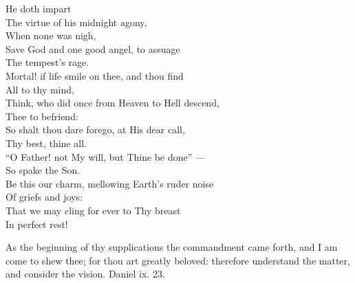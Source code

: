  He doth impart \\
 The virtue of his midnight agony, \\
 When none was nigh, \\
 Save God and one good angel, to assuage \\
 The tempest’s rage. \\
  Mortal! if life smile on thee, and thou find \\
 All to thy mind, \\
 Think, who did once from Heaven to Hell descend, \\
 Thee to befriend: \\
 So shalt thou dare forego, at His dear call, \\
 Thy best, thine all. \\
  “O Father! not My will, but Thine be done” — \\
 So spake the Son. \\
 Be this our charm, mellowing Earth’s ruder noise \\
 Of griefs and joys: \\
 That we may cling for ever to Thy breast \\
 In perfect rest!\\


As the beginning of thy supplications the commandment came forth, and I am come to shew thee; for thou art greatly beloved: therefore understand the matter, and consider the vision. Daniel ix. 23.

